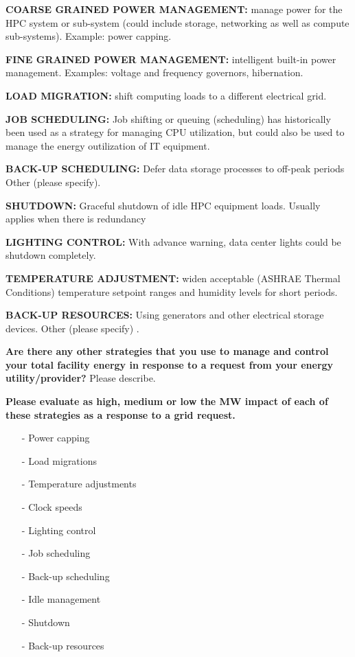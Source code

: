 \wl
\noindent
\textbf{COARSE GRAINED POWER MANAGEMENT:}  manage power for the HPC system or sub-system 
(could include storage, networking as well as compute sub-systems). 
Example: power capping. 

\wl
\noindent
\textbf{FINE GRAINED POWER MANAGEMENT:}  intelligent built-in power management.  
Examples: voltage and frequency governors, hibernation.

\wl
\noindent
\textbf{LOAD MIGRATION:}  shift computing loads to a different electrical grid.   

\wl
\noindent
\textbf{JOB SCHEDULING:}  Job shifting or queuing (scheduling) has historically been used as a 
strategy for managing CPU utilization, but could also be used to manage the energy 
outilization of IT equipment. 

\wl
\noindent
\textbf{BACK-UP SCHEDULING:}  Defer data storage processes to off-peak periods  
Other (please specify).	

\wl
\noindent
\textbf{SHUTDOWN:} Graceful shutdown of idle HPC equipment loads. Usually applies when there is redundancy 

\wl
\noindent
\textbf{LIGHTING CONTROL:} With advance warning, data center lights could be shutdown completely. 

\wl
\noindent
\textbf{TEMPERATURE ADJUSTMENT:} widen acceptable (ASHRAE Thermal Conditions) temperature setpoint 
ranges and humidity levels for short periods.  

\wl
\noindent
\textbf{BACK-UP RESOURCES:}  Using generators and other electrical storage devices. 
Other (please specify)	.

\wl
\noindent
\textbf{Are there any other strategies that you use to manage and control your total facility 
energy in response to a request from your energy utility/provider?}
Please describe. 

\wl
\noindent
\textbf{Please evaluate as high, medium or low the MW impact of each of these strategies as a 
response to a grid request. }
\begin{itemize} [nosep]
\item[{-}] Power capping	
\item[{-}] Load migrations	
\item[{-}] Temperature adjustments	
\item[{-}] Clock speeds	
\item[{-}] Lighting control	
\item[{-}] Job scheduling	
\item[{-}] Back-up scheduling	
\item[{-}] Idle management	
\item[{-}] Shutdown	
\item[{-}] Back-up resources	
\end{itemize}

